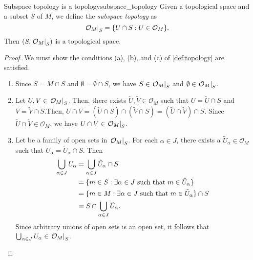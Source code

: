 \begin{proposition}{Subspace topology is a topology}{subspace_topology}
    Given a topological space  and a subset \(S\) of \(M\), we define the \emph{subspace topology}  as
    \begin{equation*}
        \left.\mathcal{O}_M\right\rvert_{S} = \{U \cap S : U \in \mathcal{O}_M\}.
    \end{equation*}
    Then \((S, \left.\mathcal{O}_M\right\rvert_{S})\) is a topological space.
\end{proposition}
\begin{proof}
    We must show the conditions (a), (b), and (c) of \cref{def:topology} are satisfied.
    \begin{enumerate}[label=(\alph*)]
        \item Since \(S = M \cap S\) and \(\emptyset = \emptyset \cap S\), we have \(S \in \left.\mathcal{O}_M\right\rvert_{S}\) and \(\emptyset \in \left.\mathcal{O}_M\right\rvert_{S}\).
        \item Let \(U, V \in \left.\mathcal{O}_M\right\rvert_{S}\). Then, there exists \(\tilde{U}, \tilde{V} \in \mathcal{O}_M\) such that \(U = \tilde{U} \cap S\) and \(V = \tilde{V} \cap S\).Then, \(U \cap V = (\tilde{U}\cap S) \cap (\tilde{V} \cap S) = (\tilde{U}\cap\tilde{V})\cap S\). Since \(\tilde{U} \cap \tilde{V} \in \mathcal{O}_M\), we have \(U \cap V \in \left.\mathcal{O}_M\right\rvert_{S}\).
        \item Let  be a family of open sets in \(\left.\mathcal{O}_M\right\rvert_{S}\). For each \(\alpha \in J\), there exists a \(\tilde{U}_\alpha\in\mathcal{O}_M\) such that \(U_\alpha = \tilde{U}_\alpha \cap S\). Then
            \begin{align*}
                \bigcup_{\alpha \in J} U_\alpha &= \bigcup_{\alpha \in J} \tilde{U}_\alpha \cap S\\
                                                &= \{m \in S : \exists \alpha \in J \text{ such that } m \in \tilde{U}_\alpha\}\\
                                                &= \{m \in M : \exists \alpha \in J \text{ such that } m \in \tilde{U}_\alpha\} \cap S\\
                                                &= S\cap\bigcup_{\alpha\in J}\tilde{U}_\alpha.
            \end{align*}
        Since arbitrary unions of open sets is an open set, it follows that \(\bigcup_{\alpha\in J}U_\alpha \in \left.\mathcal{O}_M\right\rvert_{S}\).
    \end{enumerate}
\end{proof}

